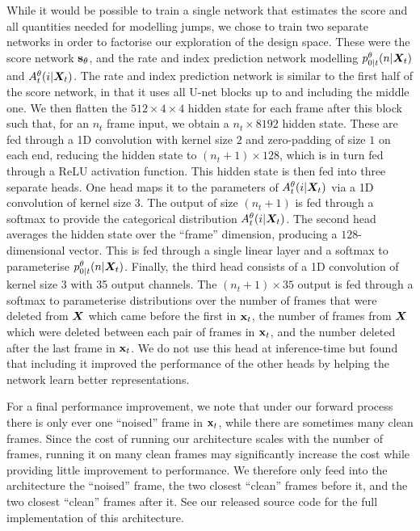 While it would be possible to train a single network that estimates the score and all quantities needed for modelling jumps, we chose to train two separate networks in order to factorise our exploration of the design space. These were the score network ${\mathbf{s}}_\theta$, and the rate and index prediction network modelling $p_{0|t}^\theta(n | {\bm{X}}_t)$ and $A_t^\theta(i | {\bm{X}}_t)$. The rate and index prediction network is similar to the first half of the score network, in that it uses all U-net blocks up to and including the middle one. We then flatten the $512\times4\times4$ hidden state for each frame after this block such that, for an $n_t$ frame input, we obtain a $n_t \times 8192$ hidden state. These are fed through a 1D convolution with kernel size $2$ and zero-padding of size $1$ on each end, reducing the hidden state to $(n_t+1) \times 128$, which is in turn fed through a ReLU activation function. This hidden state is then fed into three separate heads. One head maps it to the parameters of $A_t^\theta(i | {\bm{X}}_t)$ via a 1D convolution of kernel size 3. The output of size $(n_t+1)$ is fed through a softmax to provide the categorical distribution $A_t^\theta(i | {\bm{X}}_t)$. The second head averages the hidden state over the ``frame'' dimension, producing a $128$-dimensional vector. This is fed through a single linear layer and a softmax to parameterise $p_{0|t}^\theta(n | {\bm{X}}_t)$. Finally, the third head consists of a 1D convolution of kernel size 3 with 35 output channels. The $(n_t+1)\times35$ output is fed through a softmax to parameterise distributions over the number of frames that were deleted from ${\bm{X}}$ which came before the first in ${\mathbf{x}}_t$, the number of frames from ${\bm{X}}$ which were deleted between each pair of frames in ${\mathbf{x}}_t$, and the number deleted after the last frame in ${\mathbf{x}}_t$. We do not use this head at inference-time but found that including it improved the performance of the other heads by helping the network learn better representations. 

For a final performance improvement, we note that under our forward process there is only ever one ``noised'' frame in ${\mathbf{x}}_t$, while there are sometimes many clean frames. Since the cost of running our architecture scales with the number of frames, running it on many clean frames may significantly increase the cost while providing little improvement to performance. We therefore only feed into the architecture the ``noised'' frame, the two closest ``clean'' frames before it, and the two closest ``clean'' frames after it. See our released source code for the full implementation of this architecture.

